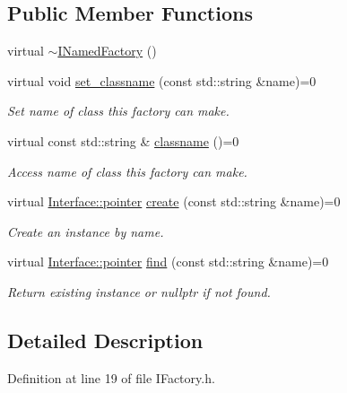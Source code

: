 \subsection*{Public Member Functions}
\begin{DoxyCompactItemize}
\item 
virtual \hyperlink{class_wire_cell_1_1_i_named_factory_aae114af54abe808635cd2f29f1bbddbb}{$\sim$\+I\+Named\+Factory} ()
\item 
virtual void \hyperlink{class_wire_cell_1_1_i_named_factory_a9175190c6f03f9d7fb43f3c8643e10d6}{set\+\_\+classname} (const std\+::string \&name)=0
\begin{DoxyCompactList}\small\item\em Set name of class this factory can make. \end{DoxyCompactList}\item 
virtual const std\+::string \& \hyperlink{class_wire_cell_1_1_i_named_factory_aa66da8d5128e202367b56a0a340dc754}{classname} ()=0
\begin{DoxyCompactList}\small\item\em Access name of class this factory can make. \end{DoxyCompactList}\item 
virtual \hyperlink{class_wire_cell_1_1_interface_a09c548fb8266cfa39afb2e74a4615c37}{Interface\+::pointer} \hyperlink{class_wire_cell_1_1_i_named_factory_aab305aa4c3d65450f97f95b26475d3fe}{create} (const std\+::string \&name)=0
\begin{DoxyCompactList}\small\item\em Create an instance by name. \end{DoxyCompactList}\item 
virtual \hyperlink{class_wire_cell_1_1_interface_a09c548fb8266cfa39afb2e74a4615c37}{Interface\+::pointer} \hyperlink{class_wire_cell_1_1_i_named_factory_a4e87a7c8957a57aa6d23fef2f9e1dbd3}{find} (const std\+::string \&name)=0
\begin{DoxyCompactList}\small\item\em Return existing instance or nullptr if not found. \end{DoxyCompactList}\end{DoxyCompactItemize}


\subsection{Detailed Description}


Definition at line 19 of file I\+Factory.\+h.



